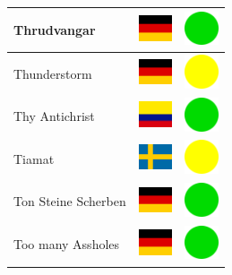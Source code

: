 \documentclass[12pt, a4paper, twoside]{report}
\begin{document}
\begin{center}
\begin{longtable}{|p{5cm}|p{2cm}|p{2cm}|}
 Thrudvangar                                                & \includegraphics[width=1cm]{4x3/de} &   \includegraphics[width=1cm]{likes/y} \\ \hline
 Thunderstorm                                               & \includegraphics[width=1cm]{4x3/de} &   \includegraphics[width=1cm]{likes/m} \\ \hline
 Thy Antichrist                                             & \includegraphics[width=1cm]{4x3/co} &   \includegraphics[width=1cm]{likes/y} \\ \hline
 Tiamat                                                     & \includegraphics[width=1cm]{4x3/se} &   \includegraphics[width=1cm]{likes/m} \\ \hline
 Ton Steine Scherben                                        & \includegraphics[width=1cm]{4x3/de} &   \includegraphics[width=1cm]{likes/y} \\ \hline
 Too many Assholes                                          & \includegraphics[width=1cm]{4x3/de} &   \includegraphics[width=1cm]{likes/y} \\ \hline

\end{longtable}
\end{center}
\end{document}
